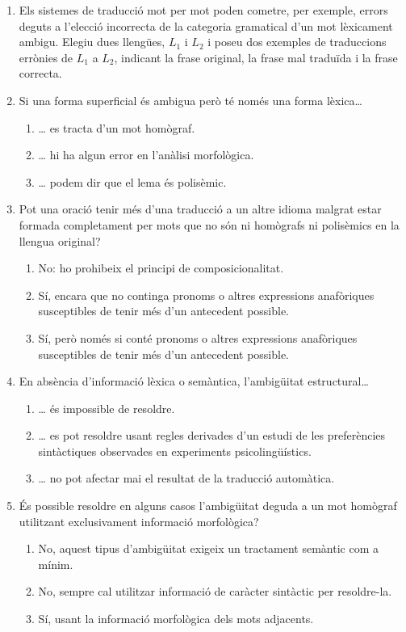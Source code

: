 \begin{enumerate}
\item Els sistemes de traducció mot per mot poden cometre, per
  exemple, errors deguts a l'elecció incorrecta de la categoria
  gramatical d'un mot lèxicament ambigu. Elegiu dues llengües, $L_1$ i
  $L_2$ i poseu dos exemples de traduccions errònies de $L_1$ a $L_2$,
  indicant la frase original, la frase mal traduïda i la frase
  correcta.

\item Si una forma superficial és ambigua però té només una forma
  lèxica{\ldots}   
  \begin{enumerate}
  \item {\ldots} es tracta d'un mot homògraf.
  \item {\ldots} hi ha algun error en l'anàlisi morfològica.
  \item {\ldots} podem dir que el lema és polisèmic.
  \end{enumerate}

\item Pot una oració tenir més d'una traducció a un altre idioma
  malgrat estar formada completament per mots que no són ni homògrafs
  ni polisèmics en la llengua original?
  \begin{enumerate}
  \item No: ho prohibeix el principi de composicionalitat.
  \item Sí, encara que no continga pronoms o altres expressions
    anafòriques susceptibles de tenir més d'un antecedent possible.
  \item Sí, però només si conté pronoms o altres expressions
    anafòriques susceptibles de tenir més d'un antecedent possible.
  \end{enumerate}

\item En absència d'informació lèxica o semàntica, l'ambigüitat
  estructural{\ldots}
  \begin{enumerate}
  \item {\ldots} és impossible de resoldre.
  \item {\ldots} es pot resoldre usant regles derivades d'un estudi de
    les preferències sintàctiques observades en experiments
    psicolingüístics.
  \item {\ldots} no pot afectar mai el resultat de la traducció
    automàtica.
  \end{enumerate}

\item És possible resoldre en alguns casos l'ambigüitat deguda a un
  mot homògraf utilitzant exclusivament informació morfològica?
  \begin{enumerate}
  \item No, aquest tipus d'ambigüitat exigeix un tractament semàntic
    com a mínim.
  \item No, sempre cal utilitzar informació de caràcter sintàctic per
    resoldre-la.
  \item Sí, usant la informació morfològica dels mots adjacents.
  \end{enumerate}


\end{enumerate}
